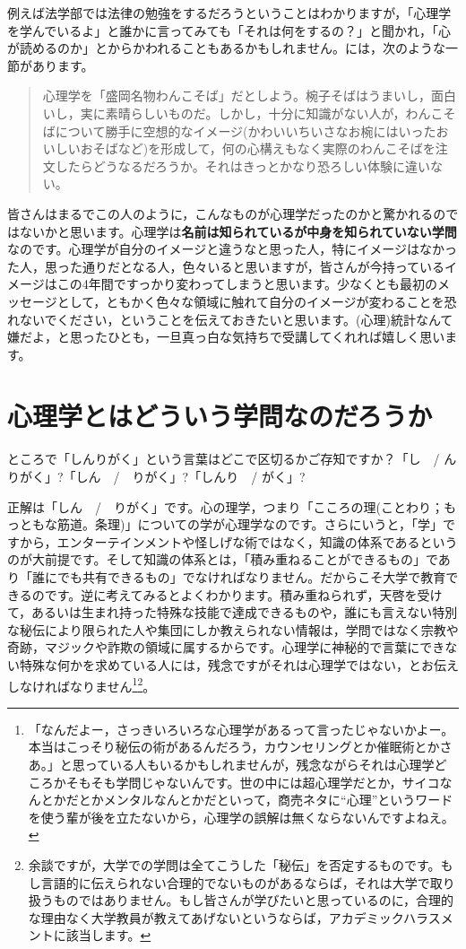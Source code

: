 \documentclass{ltjsbook}
\begin{document}
例えば法学部では法律の勉強をするだろうということはわかりますが，「心理学を学んでいるよ」と誰かに言ってみても「それは何をするの？」と聞かれ，「心が読めるのか」とからかわれることもあるかもしれません。\citet{道又200903}には，次のような一節があります。

\begin{quote}
    心理学を「盛岡名物わんこそば」だとしよう。椀子そばはうまいし，面白いし，実に素晴らしいものだ。しかし，十分に知識がない人が，わんこそばについて勝手に空想的なイメージ(かわいいちいさなお椀にはいったおいしいおそばなど)を形成して，何の心構えもなく実際のわんこそばを注文したらどうなるだろうか。それはきっとかなり恐ろしい体験に違いない。
\end{quote}

皆さんはまるでこの人のように，こんなものが心理学だったのかと驚かれるのではないかと思います。心理学は\textbf{名前は知られているが中身を知られていない学問}なのです。心理学が自分のイメージと違うなと思った人，特にイメージはなかった人，思った通りだとなる人，色々いると思いますが，皆さんが今持っているイメージはこの4年間ですっかり変わってしまうと思います。少なくとも最初のメッセージとして，ともかく色々な領域に触れて自分のイメージが変わることを恐れないでください，ということを伝えておきたいと思います。(心理)統計なんて嫌だよ，と思ったひとも，一旦真っ白な気持ちで受講してくれれば嬉しく思います。

\section{心理学とはどういう学問なのだろうか} 

ところで「しんりがく」という言葉はどこで区切るかご存知ですか？「し　/ んりがく」?「しん　/　りがく」?「しんり　/ がく」?

正解は「しん　/　りがく」です。心の理学，つまり「こころの理(ことわり；もっともな筋道。条理)」についての学が心理学なのです。さらにいうと，「学」ですから，エンターテインメントや怪しげな術ではなく，知識の体系であるというのが大前提です。そして知識の体系とは，「積み重ねることができるもの」であり「誰にでも共有できるもの」でなければなりません。だからこそ大学で教育できるのです。逆に考えてみるとよくわかります。積み重ねられず，天啓を受けて，あるいは生まれ持った特殊な技能で達成できるものや，誰にも言えない特別な秘伝により限られた人や集団にしか教えられない情報は，学問ではなく宗教や奇跡，マジックや詐欺の領域に属するからです。心理学に神秘的で言葉にできない特殊な何かを求めている人には，残念ですがそれは心理学ではない，とお伝えしなければなりません\footnote{「なんだよー，さっきいろいろな心理学があるって言ったじゃないかよー。本当はこっそり秘伝の術があるんだろう，カウンセリングとか催眠術とかさあ。」と思っている人もいるかもしれませんが，残念ながらそれは心理学どころかそもそも学問じゃないんです。世の中には超心理学だとか，サイコなんとかだとかメンタルなんとかだといって，商売ネタに``心理''というワードを使う輩が後を立たないから，心理学の誤解は無くならないんですよねえ。}\footnote{余談ですが，大学での学問は全てこうした「秘伝」を否定するものです。もし言語的に伝えられない合理的でないものがあるならば，それは大学で取り扱うものではありません。もし皆さんが学びたいと思っているのに，合理的な理由なく大学教員が教えてあげないというならば，アカデミックハラスメントに該当します。}。
\end{document}
